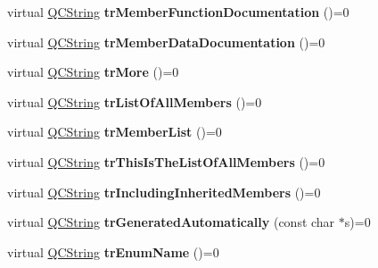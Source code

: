 \begin{DoxyCompactItemize}
\item 
\hypertarget{class_translator_a663f70a7b0ceeeb494e3c7753a3723c2}{virtual \hyperlink{class_q_c_string}{Q\-C\-String} {\bfseries tr\-Member\-Function\-Documentation} ()=0}\label{class_translator_a663f70a7b0ceeeb494e3c7753a3723c2}

\item 
\hypertarget{class_translator_a4d21332daad18f4fa4cba6fc837b4cf4}{virtual \hyperlink{class_q_c_string}{Q\-C\-String} {\bfseries tr\-Member\-Data\-Documentation} ()=0}\label{class_translator_a4d21332daad18f4fa4cba6fc837b4cf4}

\item 
\hypertarget{class_translator_af17b52cc6a1d745cce7b09d2204e762c}{virtual \hyperlink{class_q_c_string}{Q\-C\-String} {\bfseries tr\-More} ()=0}\label{class_translator_af17b52cc6a1d745cce7b09d2204e762c}

\item 
\hypertarget{class_translator_ae35a728dd94cab5a105e0a7efc4c4333}{virtual \hyperlink{class_q_c_string}{Q\-C\-String} {\bfseries tr\-List\-Of\-All\-Members} ()=0}\label{class_translator_ae35a728dd94cab5a105e0a7efc4c4333}

\item 
\hypertarget{class_translator_a233f196798866d2fdfa9ede351296aae}{virtual \hyperlink{class_q_c_string}{Q\-C\-String} {\bfseries tr\-Member\-List} ()=0}\label{class_translator_a233f196798866d2fdfa9ede351296aae}

\item 
\hypertarget{class_translator_acfebadb25eba0aad90512a3ab9ca0fd6}{virtual \hyperlink{class_q_c_string}{Q\-C\-String} {\bfseries tr\-This\-Is\-The\-List\-Of\-All\-Members} ()=0}\label{class_translator_acfebadb25eba0aad90512a3ab9ca0fd6}

\item 
\hypertarget{class_translator_a44fb128886628dc573428a2f9258ebd3}{virtual \hyperlink{class_q_c_string}{Q\-C\-String} {\bfseries tr\-Including\-Inherited\-Members} ()=0}\label{class_translator_a44fb128886628dc573428a2f9258ebd3}

\item 
\hypertarget{class_translator_acad9e3971228f977359f2766bf79268f}{virtual \hyperlink{class_q_c_string}{Q\-C\-String} {\bfseries tr\-Generated\-Automatically} (const char $\ast$s)=0}\label{class_translator_acad9e3971228f977359f2766bf79268f}

\item 
\hypertarget{class_translator_a6e0230121d45e1888e32579a61835bfa}{virtual \hyperlink{class_q_c_string}{Q\-C\-String} {\bfseries tr\-Enum\-Name} ()=0}\label{class_translator_a6e0230121d45e1888e32579a61835bfa}


\end{DoxyCompactItemize}
